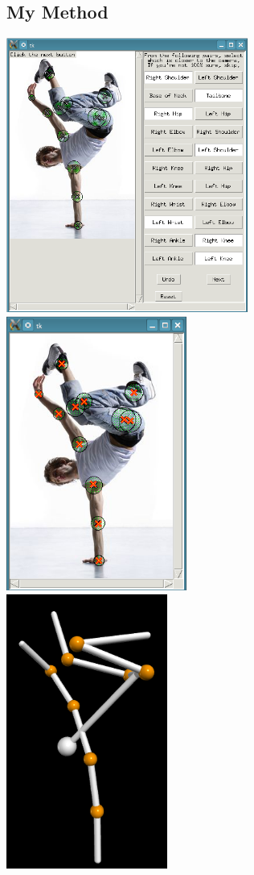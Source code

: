 \documentclass[final]{article}
\begin{document}
\begin{spacing}{1.1}
\subsection{My Method}
\begin{center}
  \includegraphics[height=9cm]{fig/mybreakdance.png}
  \includegraphics[height=9cm]{fig/mybreakdanceopt.png} \\
  \includegraphics[height=9cm]{fig/mybreakdancerecons.png}

\end{center}
\end{spacing}
\end{document}
